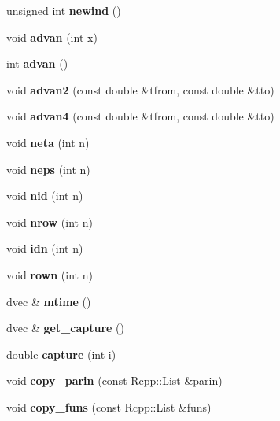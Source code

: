 \begin{DoxyCompactItemize}
unsigned int {\bfseries newind} ()
\item 
\mbox{\label{classodeproblem_a01838d1e6b48e01746eea68d4f1603a2}} 
void {\bfseries advan} (int x)
\item 
\mbox{\label{classodeproblem_a07c37e014e44c8cb933701870ca7f639}} 
int {\bfseries advan} ()
\item 
\mbox{\label{classodeproblem_a197d9523fe129bb7e35e4e20c8e09fc2}} 
void {\bfseries advan2} (const double \&tfrom, const double \&tto)
\item 
\mbox{\label{classodeproblem_a9e2b9f80bd614d5a03109e75e1fde18b}} 
void {\bfseries advan4} (const double \&tfrom, const double \&tto)
\item 
\mbox{\label{classodeproblem_a96c6c7170fe10ea41cd889e5ff0a4dcd}} 
void {\bfseries neta} (int n)
\item 
\mbox{\label{classodeproblem_a99d73608dddbb8fdaa58592bda59d45a}} 
void {\bfseries neps} (int n)
\item 
\mbox{\label{classodeproblem_ad7800dc80fb646deea76e440af5fa6c6}} 
void {\bfseries nid} (int n)
\item 
\mbox{\label{classodeproblem_ae02303871f68a48c256ccc7ce2c71981}} 
void {\bfseries nrow} (int n)
\item 
\mbox{\label{classodeproblem_ada58c0594a72e21a3aa3c56876599df4}} 
void {\bfseries idn} (int n)
\item 
\mbox{\label{classodeproblem_ad385d5c62a5a215b537cbd88a98e4d28}} 
void {\bfseries rown} (int n)
\item 
\mbox{\label{classodeproblem_a5ae9d2f4c7b37407ddeddfdbcae7590c}} 
dvec \& {\bfseries mtime} ()
\item 
\mbox{\label{classodeproblem_a54adaa665b551ba6ffe835e2d2ddf48f}} 
dvec \& {\bfseries get\+\_\+capture} ()
\item 
\mbox{\label{classodeproblem_a9a053ea59d585643d52825c31e9ed203}} 
double {\bfseries capture} (int i)
\item 
\mbox{\label{classodeproblem_a0058d8ce64adbefd960571d19de47ca4}} 
void {\bfseries copy\+\_\+parin} (const Rcpp\+::\+List \&parin)
\item 
\mbox{\label{classodeproblem_a44cc384c4d3c6e9c95dbafdfc92ba7b6}} 
void {\bfseries copy\+\_\+funs} (const Rcpp\+::\+List \&funs)
\end{DoxyCompactItemize}
